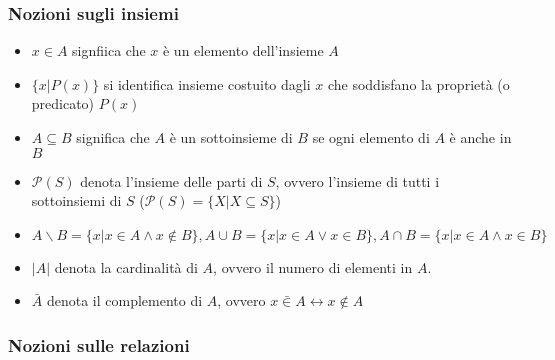 \documentclass[a4paper]{article}
\begin{document}
\subsubsection{Nozioni sugli insiemi}

\begin{itemize}
    \item $x \in A$ signfiica che $x$ è un elemento dell'insieme $A$
    \item $\{x | P(x)\}$ si identifica insieme costuito dagli $x$ che soddisfano la proprietà (o predicato) $P(x)$
    \item $A \subseteq B$ significa che $A$ è un sottoinsieme di $B$ se ogni elemento di $A$ è anche in $B$
    \item $\mathcal{P}(S)$ denota l'insieme delle parti di $S$, ovvero l'insieme di tutti i sottoinsiemi di $S$ ($\mathcal{P}(S) = \{X | X \subseteq S\}$)
    \item $A \backslash B = \{x | x \in A \land x \notin B\}, A \cup B = \{x | x \in A \lor x \in B\}, A \cap B = \{x | x \in A \land x \in B\}$   
    \item $|A|$ denota la cardinalità di $A$, ovvero il numero di elementi in $A$.
    \item $\bar{A}$ denota il complemento di $A$, ovvero $x \bar{\in} A \leftrightarrow x \notin A$
\end{itemize}

\subsubsection{Nozioni sulle relazioni}
\end{document}

